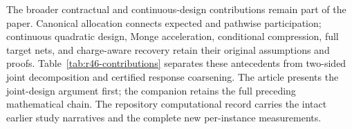 The broader contractual and continuous-design contributions remain part of the paper. Canonical allocation connects expected and pathwise participation; continuous quadratic design, Monge acceleration, conditional compression, full target nets, and charge-aware recovery retain their original assumptions and proofs. Table~\ref{tab:r46-contributions} separates these antecedents from two-sided joint decomposition and certified response coarsening. The article presents the joint-design argument first; the companion retains the full preceding mathematical chain. The repository computational record carries the intact earlier study narratives and the complete new per-instance measurements.
